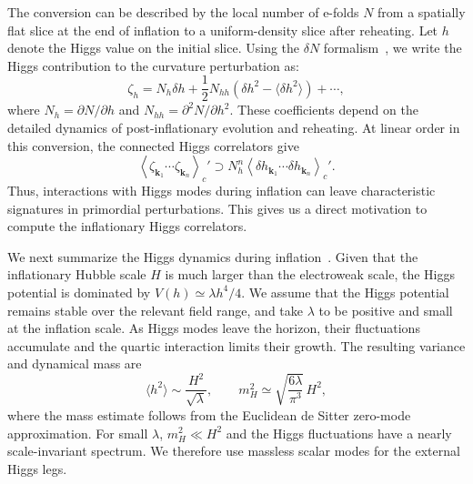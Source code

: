 \documentclass[a4paper,12pt]{article}
\def\mb{\mathbf}
\begin{document}
The conversion can be described by the local number of e-folds $N$ from a spatially flat slice at the end of inflation to a uniform-density slice after reheating.
Let $h$ denote the Higgs value on the initial slice.
Using the $\delta N$ formalism~\cite{lyth_inflationary_2005,sasaki_general_1996,starobinsky_dynamics_1982,starobinsky_multicomponent_1985,lyth_general_2005}, we write the Higgs contribution to the curvature perturbation as:
\begin{equation}
    \zeta_h=N_h\delta h
    +\frac12N_{hh}\left(\delta h^2-\langle\delta h^2\rangle\right)
    +\cdots,
    \label{eq:overview-delta-n}
\end{equation}
where $N_h=\partial N/\partial h$ and $N_{hh}=\partial^2N/\partial h^2$.
These coefficients depend on the detailed dynamics of post-inflationary evolution and reheating.
At linear order in this conversion, the connected Higgs correlators give
\begin{equation}
    \left\langle\zeta_{\mb k_1}\cdots\zeta_{\mb k_n}\right\rangle_c'
    \supset N_h^n
    \left\langle\delta h_{\mb k_1}\cdots
    \delta h_{\mb k_n}\right\rangle_c'.
    \label{eq:overview-correlator-transfer}
\end{equation}
Thus, interactions with Higgs modes during inflation can leave characteristic signatures in primordial perturbations.
This gives us a direct motivation to compute the inflationary Higgs correlators.

We next summarize the Higgs dynamics during inflation~\cite{chen_mass_spectrum_2017,chen_standard_model_background_2017}.
Given that the inflationary Hubble scale $H$ is much larger than the electroweak scale, the Higgs potential is dominated by $V(h)\simeq\lambda h^4/4$.
We assume that the Higgs potential remains stable over the relevant field range, and take $\lambda$ to be positive and small at the inflation scale.
As Higgs modes leave the horizon, their fluctuations accumulate and the quartic interaction limits their growth.
The resulting variance and dynamical mass are
\begin{equation}
    \langle h^2\rangle\sim\frac{H^2}{\sqrt\lambda},\qquad
    m_H^2\simeq\sqrt{\frac{6\lambda}{\pi^3}}\,H^2,
    \label{eq:overview-higgs-mass}
\end{equation}
where the mass estimate follows from the Euclidean de Sitter zero-mode approximation.
For small $\lambda$, $m_H^2\ll H^2$ and the Higgs fluctuations have a nearly scale-invariant spectrum.
We therefore use massless scalar modes for the external Higgs legs.
\end{document}
